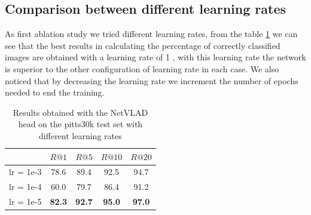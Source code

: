 \documentclass[10pt,twocolumn,letterpaper]{article}
\begin{document}
\subsection{Comparison between different learning rates}
As first ablation study we tried different learning rates, from the table \ref{tab:NETVLAD:lr} we can see that the best results in calculating the percentage of correctly classified images are obtained with a learning rate of 1 , with this learning rate the network is superior to the other configuration of learning rate in each case. We also noticed that by decreasing the learning rate we increment the number of epochs needed to end the training.
\begin{table}
	\centering
	\begin{tabular}{|l|c|c|c|c|}
		\hline
		&          $R@1$  &        $R@5$  &        $R@10$ &        $R@20$   \\ \hline     
		lr = 1e-3 &         78.6    &    89.4       &    92.5       &         94.7       \\
		lr = 1e-4 &         60.0    &         79.7  & 86.4 & 91.2  \\    
		lr = 1e-5 & \textbf{82.3}   & \textbf{92.7} &         \textbf{95.0}  & \textbf{97.0}          \\
		\hline
	\end{tabular}
	\caption{Results obtained with the NetVLAD head on the pitts30k test set with different learning rates}
	\label{tab:NETVLAD:lr}
\end{table}
\end{document}
